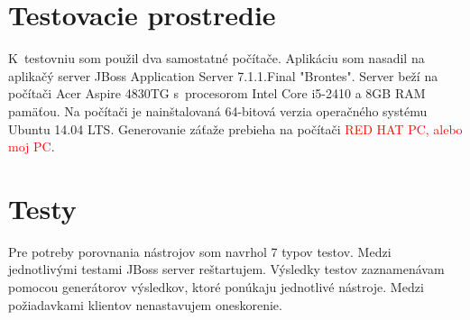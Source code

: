 \documentclass[12pt,oneside,final]{fithesis-utf8}
\newcommand\todo[1]{\textcolor{red}{#1}}
\begin{document}
\section{Testovacie prostredie}
K~testovniu som použil dva samostatné počítače. Aplikáciu som nasadil na aplikačý server JBoss Application Server 7.1.1.Final "{}Brontes". Server beží na počítači Acer Aspire 4830TG s~procesorom Intel Core i5-2410 a 8GB RAM pamäťou. Na počítači je nainštalovaná 64-bitová verzia operačného systému Ubuntu 14.04 LTS. Generovanie záťaže prebieha na počítači \todo{RED HAT PC, alebo moj PC}.

\newpage
\section{Testy}
Pre potreby porovnania nástrojov som navrhol 7 typov testov. Medzi jednotlivými testami JBoss server reštartujem. Výsledky testov zaznamenávam pomocou generátorov výsledkov, ktoré ponúkaju jednotlivé nástroje. Medzi požiadavkami klientov nenastavujem oneskorenie.
\newline
\end{document}
